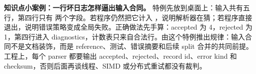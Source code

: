 \begin{casebox}
\textbf{知识点小案例：一行坏日志怎样逼出输入合同。}
特例先放到桌面上：输入共有五行，第四行只有  两个字段。若程序仍然把它计入 ，说明解析器在猜；若程序直接退出，说明错误策略变成全局失败。正确做法先手算：accepted 为 4，rejected 为 1，第四行进入 diagnostics，计数表只来自合法行。由这个特例推出规律：输入合同不是文档装饰，而是 reference、测试、错误摘要和后续 split 合并的共同前提。工程上，每个 parser 都要输出 accepted、rejected、record id、error kind 和 checksum，否则后面再谈线程、SIMD 或分布式重试都没有裁判。
\end{casebox}
